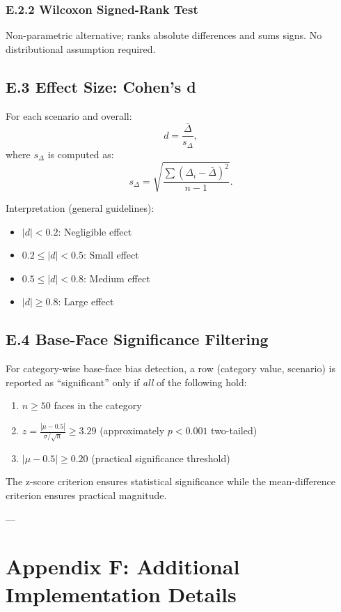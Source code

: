 \subsubsection*{E.2.2 Wilcoxon Signed-Rank Test}

Non-parametric alternative; ranks absolute differences and sums signs. No distributional assumption required.

\subsection*{E.3 Effect Size: Cohen's d}

For each scenario and overall:
\[
d = \frac{\bar{\Delta}}{s_\Delta},
\]
where $s_\Delta$ is computed as:
\[
s_\Delta = \sqrt{\frac{\sum (\Delta_i - \bar{\Delta})^2}{n - 1}}.
\]

Interpretation (general guidelines):
\begin{itemize}
    \item $|d| < 0.2$: Negligible effect
    \item $0.2 \le |d| < 0.5$: Small effect
    \item $0.5 \le |d| < 0.8$: Medium effect
    \item $|d| \ge 0.8$: Large effect
\end{itemize}

\subsection*{E.4 Base-Face Significance Filtering}

For category-wise base-face bias detection, a row (category value, scenario) is reported as ``significant'' only if \emph{all} of the following hold:

\begin{enumerate}
    \item $n \ge 50$ faces in the category
    \item $z = \frac{|\mu - 0.5|}{\sigma / \sqrt{n}} \ge 3.29$ (approximately $p < 0.001$ two-tailed)
    \item $|\mu - 0.5| \ge 0.20$ (practical significance threshold)
\end{enumerate}

The z-score criterion ensures statistical significance while the mean-difference criterion ensures practical magnitude.

---

\section*{Appendix F: Additional Implementation Details}

